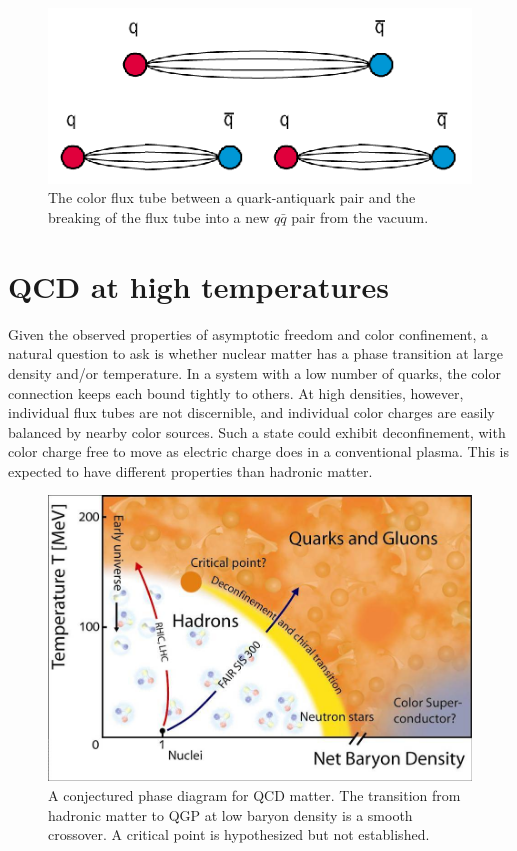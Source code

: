 \begin{figure}[t]
  \includegraphics{qqbar_flux.png}
  \caption{The color flux tube between a quark-antiquark pair and the breaking of the flux tube into a new $q\bar{q}$ pair from the vacuum.}
  \label{fig:qqbar_flux}
\end{figure}


\section{QCD at high temperatures}

Given the observed properties of asymptotic freedom and color confinement, a natural question to ask is whether nuclear matter has a phase transition at large density and/or temperature.
In a system with a low number of quarks, the color connection keeps each bound tightly to others.
At high densities, however, individual flux tubes are not discernible, and individual color charges are easily balanced by nearby color sources.
Such a state could exhibit deconfinement, with color charge free to move as electric charge does in a conventional plasma.
This \qgp is expected to have different properties than hadronic matter.

\begin{figure}[t]
  \includegraphics{qcd_phase.jpg}
  \caption{A conjectured phase diagram for QCD matter. The transition from hadronic matter to QGP at low baryon density is a smooth crossover. A critical point is hypothesized but not established.}
  \label{fig:qcd_phase}
\end{figure}


